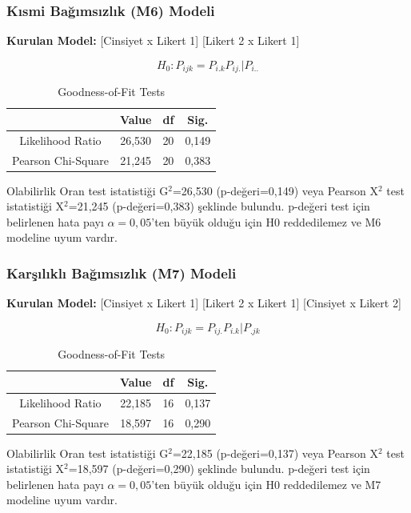 \documentclass{article}
\begin{document}
\vspace{10pt}
\subsubsection{Kısmi Bağımsızlık (M6) Modeli}
\textbf{Kurulan Model:} [Cinsiyet x Likert 1] [Likert 2 x Likert 1]

$$H_0: P_{ijk} = P_{i.k}P_{ij.}|P_{i..}$$

\begin{table}[h]
    \centering
    \caption{Goodness-of-Fit Tests}
    \begin{tabular}{|c|c|c|c|}
         \hline
          & \textbf{Value} & \textbf{df} & \textbf{Sig.} \\
         \hline
         Likelihood Ratio & 26,530 & 20 & 0,149 \\
         Pearson Chi-Square & 21,245 & 20 & 0,383 \\
         \hline
    \end{tabular}
    \label{tab:goodness-of-fit7}
\end{table}
Olabilirlik Oran test istatistiği G$^2$=26,530 (p-değeri=0,149) veya Pearson X$^2$ test istatistiği X$^2$=21,245 (p-değeri=0,383) şeklinde bulundu. p-değeri test için belirlenen hata payı $\alpha=0,05$'ten büyük olduğu için H0 reddedilemez ve M6 modeline uyum vardır.

\vspace{10pt}
\subsubsection{Karşılıklı Bağımsızlık (M7) Modeli}
\textbf{Kurulan Model:} [Cinsiyet x Likert 1] [Likert 2 x Likert 1] [Cinsiyet x Likert 2]

$$H_0: P_{ijk} = P_{ij.}P_{i.k}|P_{.jk}$$

\begin{table}[h]
    \centering
    \caption{Goodness-of-Fit Tests}
    \begin{tabular}{|c|c|c|c|}
         \hline
          & \textbf{Value} & \textbf{df} & \textbf{Sig.} \\
         \hline
         Likelihood Ratio & 22,185 & 16 & 0,137 \\
         Pearson Chi-Square & 18,597 & 16 & 0,290 \\
         \hline
    \end{tabular}
    \label{tab:goodness-of-fit8}
\end{table}
Olabilirlik Oran test istatistiği G$^2$=22,185 (p-değeri=0,137) veya Pearson X$^2$ test istatistiği X$^2$=18,597 (p-değeri=0,290) şeklinde bulundu. p-değeri test için belirlenen hata payı $\alpha=0,05$'ten büyük olduğu için H0 reddedilemez ve M7 modeline uyum vardır.
\end{document}
